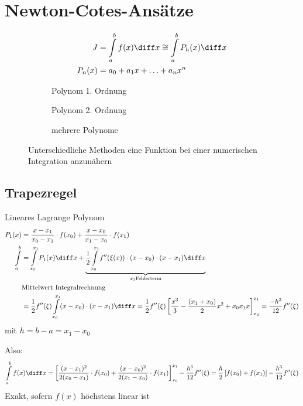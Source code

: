 \section{Newton-Cotes-Ansätze}
\begin{equation}
\begin{split}
J &= \int\limits_a^bf(x)\diff x \cong\int\limits_a^bP_h(x)\diff x\\
P_n(x) &= a_0 + a_1x + \ldots + a_nx^n
\end{split}
\end{equation}

\begin{figure}
	\center
	\begin{subfigure}{0.3\textwidth}
		
		\caption{Polynom 1. Ordnung}
	\end{subfigure}
	\begin{subfigure}{0.3\textwidth}
		
		\caption{Polynom 2. Ordnung}
	\end{subfigure}
	\begin{subfigure}{0.3\textwidth}
		
		\caption{mehrere Polynome}
	\end{subfigure}
	\caption{Unterschiedliche Methoden eine Funktion bei einer numerischen Integration anzunähern}
\end{figure}

\subsection{Trapezregel}
Lineares Lagrange Polynom
\begin{equation}
\begin{split}
P_1(x) &= \frac{x-x_1}{x_0-x_1}\cdot f(x_0) + \frac{x-x_0}{x_1-x_0}\cdot f(x_1)\\
\int\limits_a^b &= \int\limits_{x_0}^{x_1}P_1(x)\diff x + \underbrace{\frac{1}{2}\int\limits_{x_0}^{x_1}f''(\xi(x))\cdot (x-x_0)\cdot (x-x_1)\diff x}_{x_1 \text{Fehlerterm}}\\
 & \text{Mittelwert Integralrechnung}\\
 &= \frac{1}{2}f''(\xi)\int\limits_{x_0}^{x_1}(x-x_0)\cdot (x-x_1)\diff x = \frac{1}{2}f''(\xi)\left[\frac{x^3}{3}-\frac{(x_1+x_0)}{2}x^2+x_0x_1x\right]_{x_0}^{x_1} = \frac{-h^3}{12}f''(\xi)
\end{split}
\end{equation}
mit $h = b-a = x_1-x_0$

Also:
\begin{equation}
\int\limits_a^bf(x)\diff x = \left[\frac{(x-x_1)^2}{2(x_0-x_1)}\cdot f(x_0) + \frac{(x-x_0)^2}{2(x_1-x_0)}\cdot f(x_1)\right]_{x_0}^{x_1} - \frac{h^3}{12}f''(\xi) = \frac{h}{2}\left[f(x_0) + f(x_1)\right] - \frac{h^3}{12}f''(\xi)
\end{equation}
Exakt, sofern $f(x)$ höchstens linear ist

